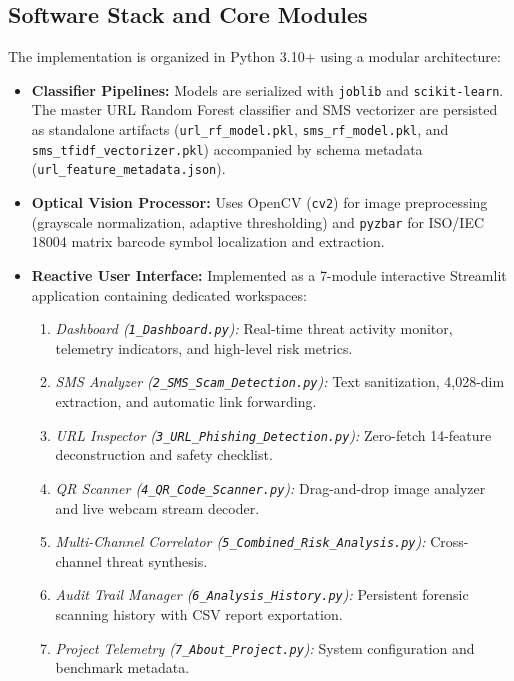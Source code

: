 \documentclass[conference]{IEEEtran}
\begin{document}
\subsection{Software Stack and Core Modules}
The implementation is organized in Python 3.10+ using a modular architecture:
\begin{itemize}
    \item \textbf{Classifier Pipelines:} Models are serialized with \texttt{joblib} and \texttt{scikit-learn}. The master URL Random Forest classifier and SMS vectorizer are persisted as standalone artifacts (\texttt{url\_rf\_model.pkl}, \texttt{sms\_rf\_model.pkl}, and \texttt{sms\_tfidf\_vectorizer.pkl}) accompanied by schema metadata (\texttt{url\_feature\_metadata.json}).
    \item \textbf{Optical Vision Processor:} Uses OpenCV (\texttt{cv2}) for image preprocessing (grayscale normalization, adaptive thresholding) and \texttt{pyzbar} for ISO/IEC 18004 matrix barcode symbol localization and extraction.
    \item \textbf{Reactive User Interface:} Implemented as a 7-module interactive Streamlit application containing dedicated workspaces:
    \begin{enumerate}
        \item \textit{Dashboard (\texttt{1\_Dashboard.py}):} Real-time threat activity monitor, telemetry indicators, and high-level risk metrics.
        \item \textit{SMS Analyzer (\texttt{2\_SMS\_Scam\_Detection.py}):} Text sanitization, 4,028-dim extraction, and automatic link forwarding.
        \item \textit{URL Inspector (\texttt{3\_URL\_Phishing\_Detection.py}):} Zero-fetch 14-feature deconstruction and safety checklist.
        \item \textit{QR Scanner (\texttt{4\_QR\_Code\_Scanner.py}):} Drag-and-drop image analyzer and live webcam stream decoder.
        \item \textit{Multi-Channel Correlator (\texttt{5\_Combined\_Risk\_Analysis.py}):} Cross-channel threat synthesis.
        \item \textit{Audit Trail Manager (\texttt{6\_Analysis\_History.py}):} Persistent forensic scanning history with CSV report exportation.
        \item \textit{Project Telemetry (\texttt{7\_About\_Project.py}):} System configuration and benchmark metadata.
    \end{enumerate}
\end{itemize}
\end{document}
